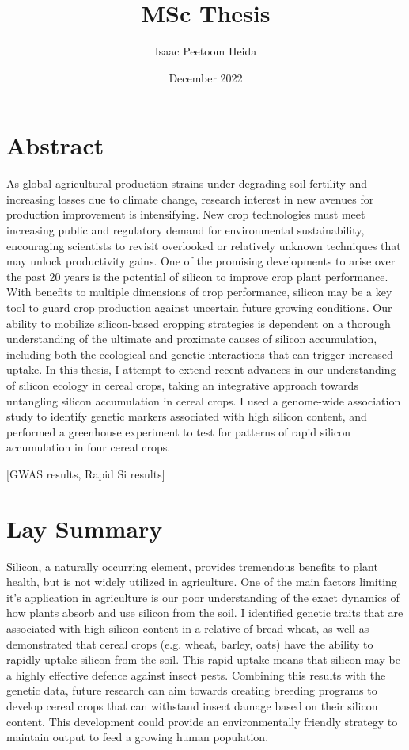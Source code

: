 \documentclass[12pt, letterpaper, ]{article}
\title{MSc Thesis}
\author{Isaac Peetoom Heida}
\date{December 2022}
\begin{document}


\tableofcontents

\section{Abstract}

As global agricultural production strains under degrading soil fertility and increasing losses due to climate change, research interest in new avenues for production improvement is intensifying. New crop technologies must meet increasing public and regulatory demand for environmental sustainability, encouraging scientists to revisit overlooked or relatively unknown techniques that may unlock productivity gains. One of the promising developments to arise over the past 20 years is the potential of silicon to improve crop plant performance. With benefits to multiple dimensions of crop performance, silicon may be a key tool to guard crop production against uncertain future growing conditions. Our ability to mobilize silicon-based cropping strategies is dependent on a thorough understanding of the ultimate and proximate causes of silicon accumulation, including both the ecological and genetic interactions that can trigger increased uptake. In this thesis, I attempt to extend recent advances in our understanding of silicon ecology in cereal crops, taking an integrative approach towards untangling silicon accumulation in cereal crops. I used a genome-wide association study to identify genetic markers associated with high silicon content, and performed a greenhouse experiment to test for patterns of rapid silicon accumulation in four cereal crops. 

[GWAS results, Rapid Si results]

\section*{Lay Summary}

Silicon, a naturally occurring element, provides tremendous benefits to plant health, but is not widely utilized in agriculture. One of the main factors limiting it's application in agriculture is our poor understanding of the exact dynamics of how plants absorb and use silicon from the soil. I identified genetic traits that are associated with high silicon content in a relative of bread wheat, as well as demonstrated that cereal crops (e.g. wheat, barley, oats) have the ability to rapidly uptake silicon from the soil. This rapid uptake means that silicon may be a highly effective defence against insect pests. Combining this results with the genetic data, future research can aim towards creating breeding programs to develop cereal crops that can withstand insect damage based on their silicon content. This development could provide an environmentally friendly strategy to maintain output to feed a growing human population.
\end{document}
